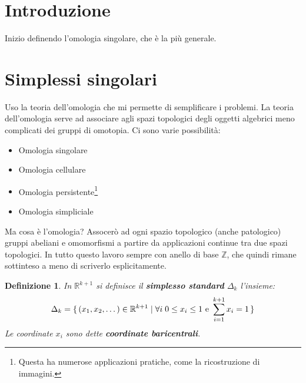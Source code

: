 \documentclass[10pt, twoside=false, x11names]{scrbook}
\newtheorem{definition}[theorem]{Definizione}
\newcommand{\Z}{\mathbb{Z}}
\newcommand{\RN}[1][]{\mathbb{R}^#1}
\begin{document}
\section{Introduzione}

Inizio definendo l'omologia singolare, che è la più generale.

\section{Simplessi singolari}

Uso la teoria dell'omologia che mi permette di semplificare i problemi. La teoria
dell'omologia serve ad associare agli spazi topologici degli oggetti algebrici
meno complicati dei gruppi di omotopia.
Ci sono varie possibilità:
\begin{itemize}
\item Omologia singolare
\item Omologia cellulare
\item Omologia persistente\footnote{Questa ha numerose applicazioni pratiche, come la ricostruzione di immagini.}
\item Omologia simpliciale
\end{itemize}
Ma cosa è l'omologia? Assocerò ad ogni spazio topologico (anche patologico) gruppi abeliani e omomorfismi a partire
da applicazioni continue tra due spazi topologici. In tutto questo lavoro sempre con anello di base $ \Z $, che
quindi rimane sottinteso a meno di scriverlo esplicitamente.

\begin{definition}
  In $ \RN{k+1} $ si definisce il \textbf{simplesso standard} $ \Delta_k $ l'insieme:
  \[
    \Delta_k = \set{(x_1,x_2,\dots) \in \RN{k+1} | \forall i \; 0 \leq x_i \leq 1 \text{ e } \sum_{i=1}^{k+1}x_i = 1}
  \]
  Le coordinate $ x_i $ sono dette \textbf{coordinate baricentrali}.
\end{definition}
\end{document}
